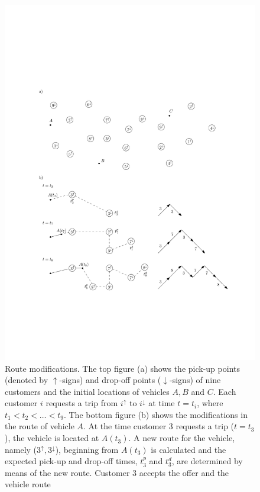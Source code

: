 \documentclass[dissertation,draft*]{aaltoseries}
\begin{document}
\begin{figure} %
\begin{center}
\includegraphics[width=1.0\textwidth]{dynamicexample09}
\caption{Route modifications. The top figure (a) shows the pick-up points (denoted by $\uparrow$-signs) and drop-off points ($\downarrow$-signs) of
nine customers and the initial locations of vehicles $A,B$ and $C$. Each customer $i$ requests a trip from $i^{\uparrow}$ to $i^{\downarrow}$
at time $t=t_i$, where $t_1 < t_2 < \ldots < t_9$. The bottom figure (b) shows the modifications in the route of vehicle $A$. 
At the time customer $3$ requests a trip ($t=t_3$), the vehicle is located at $A(t_3)$. A new route for the vehicle, namely ($3^{\uparrow},3^{\downarrow}$), beginning from $A(t_3)$ is calculated and the expected pick-up and drop-off times, $t_3^p$ and $t_3^d$, 
are determined by means of the new route. Customer $3$ accepts the offer and the vehicle route
}
\end{center}
\end{figure}
\end{document}
